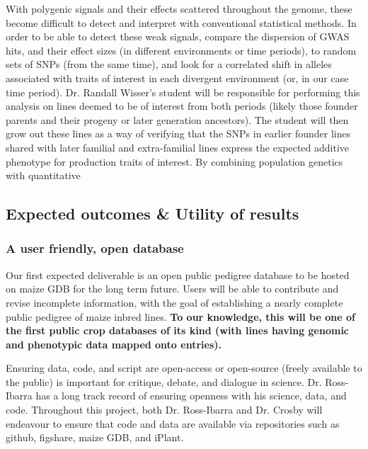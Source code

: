 \documentclass[draft,12pt]{article}
\begin{document}
With polygenic signals and their effects scattered throughout the genome, these become difficult to detect and interpret with conventional statistical methods. 
In order to be able to detect these weak signals, \cite{Berg:2014bs} compare the dispersion of GWAS hits, and their effect sizes (in different environments or time periods), to random sets of SNPs (from the same time), and look for a correlated shift in alleles associated with traits of interest in each divergent environment (or, in our case time period).
Dr. Randall Wisser's student will be responsible for performing this analysis on lines deemed to be of interest from both periods (likely those founder parents and their progeny or later generation ancestors). 
The student will then grow out these lines as a way of verifying that the SNPs in earlier founder lines shared with later familial and extra-familial lines express the expected additive phenotype for production traits of interest. 
By combining population genetics with quantitative 



\subsection*{Expected outcomes \& Utility of results}

\subsubsection*{A user friendly, open database}

Our first expected deliverable is an open public pedigree database to be hosted on maize GDB for the long term future. Users will be able to contribute and revise incomplete information, with the goal of establishing a nearly complete public pedigree of maize inbred lines. \textbf{To our knowledge, this will be one of the first public crop databases of its kind (with lines having genomic and phenotypic data mapped onto entries).}

Ensuring data, code, and script are open-access or open-source (freely available to the public) is important for critique, debate, and dialogue in science. Dr. Ross-Ibarra has a long track record of ensuring openness with his science, data, and code. Throughout this project, both Dr. Ross-Ibarra and Dr. Crosby will endeavour to ensure that code and data are available via repositories such as github, figshare, maize GDB, and iPlant.
\end{document}

